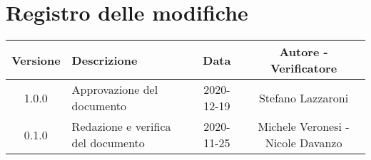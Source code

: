 \section*{Registro delle modifiche}

\begin{center}
	\begin{longtable}{|c|p{5cm}|c|c|}
	\hline
	\rowcolor{lighter-grayer}
	\textbf{Versione} & \textbf{Descrizione} & \textbf{Data} & \textbf{Autore - Verificatore} \\
	\hline
	\endfirsthead


	\hline
	1.0.0 & Approvazione del documento & 2020-12-19 &Stefano Lazzaroni\\
	0.1.0 & Redazione e verifica del documento & 2020-11-25 & Michele Veronesi - Nicole Davanzo \\
	\hline

	\end{longtable}
\end{center}